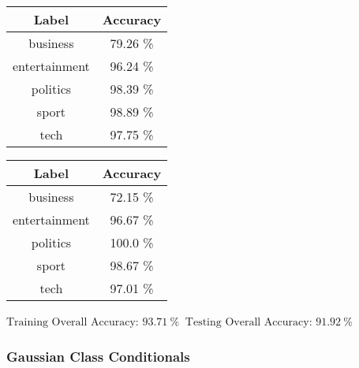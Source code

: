 \documentclass[8pt]{extarticle}
\begin{document}
    \begin{center}
        \begin{tabular}{cc}
            \hline
            Label & Accuracy\\
            \hline
            business &   79.26 \% \\
       entertainment &   96.24 \% \\
           politics  &   98.39 \% \\
              sport  &   98.89 \% \\
               tech  &   97.75 \%
         \end{tabular}
         \quad
        \begin{tabular}{cc}
            \hline
            Label & Accuracy\\
            \hline
            business &   72.15 \% \\
        entertainment &   96.67 \% \\
           politics  &  100.0 \% \\
              sport  &   98.67 \% \\
               tech  &   97.01 \%
        \end{tabular}
    \end{center}

    \begin{center}
        $\displaystyle \text{Training Overall Accuracy:\ }93.71\ \%$
        $\displaystyle \ \text{Testing Overall Accuracy:\ }91.92\ \%$
    \end{center}
    \hypertarget{gaussian-class-conditionals}{%
\subsubsection{Gaussian Class
Conditionals}\label{gaussian-class-conditionals}}
\end{document}
